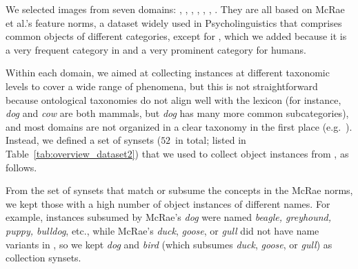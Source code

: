 We selected images from seven domains: , , , , , , . 
They are all based on McRae et al.'s  \cite{mcrae2005semantic} feature norms, a dataset widely used in Psycholinguistics that comprises common objects of different categories, except for , which we added because it is a very frequent category in \vg and a very prominent category for humans.

Within each domain, we aimed at collecting instances at different taxonomic levels to cover a wide range of phenomena, but this is not straightforward because ontological taxonomies do not align well with the lexicon (for instance, \textit{dog} and \textit{cow} are both mammals, but \textit{dog} has many more common subcategories), and most domains are not organized in a clear taxonomy in the first place (e.g.\ ).
Instead, we defined a set of synsets ($52$\ in total; listed in Table~\ref{tab:overview_dataset2}) that we used to collect object instances from \vg, as follows.

From the set of synsets that match or subsume the concepts in the McRae norms, we kept those with a high number of \vg object instances of different names.
For example, \vg instances subsumed by McRae's \textsl{dog} were named \textsl{beagle, greyhound, puppy, bulldog}, etc., while McRae's \textsl{duck}, \textsl{goose}, or \textsl{gull} did not have name variants in \vg, so we kept \textsl{dog} and \textsl{bird} (which subsumes \textsl{duck}, \textsl{goose}, or \textsl{gull}) as collection synsets.


